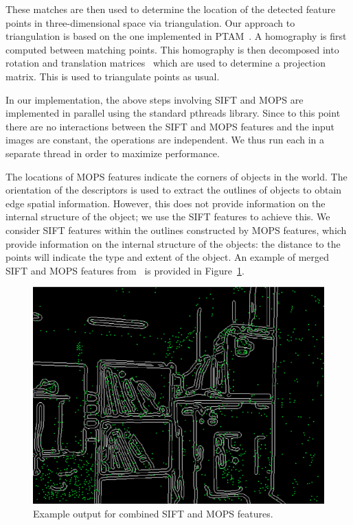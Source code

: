 \documentclass{acmsiggraph}
\begin{document}
These matches are then used to determine the location of the detected feature points in three-dimensional space via triangulation. Our approach to triangulation is based on the one implemented in PTAM~\cite{ptamcode}. A homography is first computed between matching points. This homography is then decomposed into rotation and translation matrices~\cite{inria2007} which are used to determine a projection matrix. This is used to triangulate points as usual.

In our implementation, the above steps involving SIFT and MOPS are implemented in parallel using the standard pthreads library. Since to this point there are no interactions between the SIFT and MOPS features and the input images are constant, the operations are independent. We thus run each in a separate thread in order to maximize performance.

The locations of MOPS features indicate the corners of objects in the world. The orientation of the descriptors is used to extract the outlines of objects to obtain edge spatial information. However, this does not provide information on the internal structure of the object; we use the SIFT features to achieve this. We consider SIFT features within the outlines constructed by MOPS features, which provide information on the internal structure of the objects: the distance to the points will indicate the type and extent of the object. An example of merged SIFT and MOPS features from~\cite{lee2011} is provided in Figure~\ref{fig:lee-sift-mops}.

\begin{figure}[h]
  \centering
  \includegraphics[resolution=150, scale=0.5]{images/lee-sift-mops-example}
  \caption{Example output for combined SIFT and MOPS features.}
  \label{fig:lee-sift-mops}
\end{figure}
\end{document}
